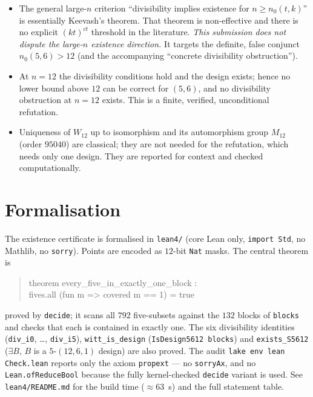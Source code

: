 \documentclass[11pt]{article}
\theoremstyle{definition}
\theoremstyle{remark}
\newcommand{\Wtwelve}{W_{12}}
\begin{document}
\begin{itemize}
\item The general large-$n$ criterion ``divisibility implies existence for
  $n \ge n_0(t,k)$'' is essentially Keevash's theorem. That theorem is
  non-effective and there is no explicit $(kt)^{ct}$ threshold in the
  literature. \emph{This submission does not dispute the large-$n$ existence
  direction.} It targets the definite, false conjunct $n_0(5,6) > 12$ (and the
  accompanying ``concrete divisibility obstruction'').
\item At $n = 12$ the divisibility conditions hold and the design exists; hence
  no lower bound above $12$ can be correct for $(5,6)$, and no divisibility
  obstruction at $n = 12$ exists. This is a finite, verified, unconditional
  refutation.
\item Uniqueness of $\Wtwelve$ up to isomorphism and its automorphism group
  $M_{12}$ (order $95040$) are classical; they are not needed for the
  refutation, which needs only one design. They are reported for context and
  checked computationally.
\end{itemize}

\section{Formalisation}

The existence certificate is formalised in \texttt{lean4/} (core Lean only,
\texttt{import Std}, no Mathlib, no \texttt{sorry}). Points are encoded as
$12$-bit \texttt{Nat} masks. The central theorem is

\begin{quote}\ttfamily
theorem every\_five\_in\_exactly\_one\_block :\\
\hspace*{2em}fives.all (fun m => covered m == 1) = true
\end{quote}

proved by \texttt{decide}; it scans all $792$ five-subsets against the $132$
blocks of \texttt{blocks} and checks that each is contained in exactly one. The
six divisibility identities (\texttt{div\_i0}, \dots, \texttt{div\_i5}),
\texttt{witt\_is\_design} (\texttt{IsDesign5612 blocks}) and
\texttt{exists\_S5612} ($\exists B$, $B$ is a $5$-$(12,6,1)$ design) are also
proved. The audit \texttt{lake env lean Check.lean} reports only the axiom
\texttt{propext} --- no \texttt{sorryAx}, and no \texttt{Lean.ofReduceBool}
because the fully kernel-checked \texttt{decide} variant is used. See
\texttt{lean4/README.md} for the build time ($\approx 63$~s) and the full
statement table.
\end{document}

